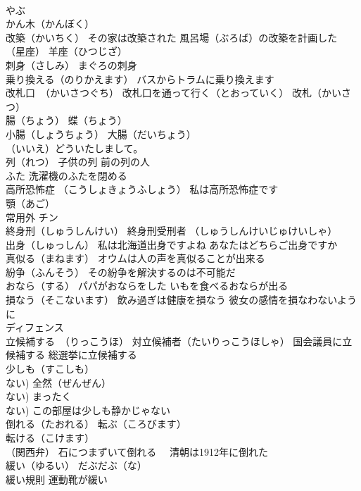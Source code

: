 \documentclass[8pt]{extreport}
\begin{document}
\begin{CJK}{UTF8}{min}
\\	やぶ 
\\	かん木（かんぼく）
\\	改築（かいちく） その家は改築された 風呂場（ぶろば）の改築を計画した
\\	（星座）	羊座（ひつじざ）
\\	刺身（さしみ） まぐろの刺身
\\	乗り換える（のりかえます） バスからトラムに乗り換えます
\\	改札口　（かいさつぐち） 改札口を通って行く（とおっていく） 改札（かいさつ） 
\\	腸（ちょう） 蝶（ちょう）
\\	小腸（しょうちょう） 大腸（だいちょう）
\\	（いいえ）どういたしまして。
\\	列（れつ） 子供の列 前の列の人
\\	ふた 洗濯機のふたを閉める
\\	高所恐怖症 （こうしょきょうふしょう） 私は高所恐怖症です
\\	顎（あご）　
\\	常用外 チン
\\	終身刑（しゅうしんけい） 終身刑受刑者 （しゅうしんけいじゅけいしゃ）
\\	出身（しゅっしん） 私は北海道出身ですよね あなたはどちらご出身ですか
\\	真似る（まねます） オウムは人の声を真似ることが出来る
\\	紛争（ふんそう） その紛争を解決するのは不可能だ
\\	おなら（する） パパがおならをした いもを食べるおならが出る
\\	損なう（そこないます） 飲み過ぎは健康を損なう 彼女の感情を損なわないように
\\	ディフェンス
\\	立候補する　（りっこうほ） 対立候補者（たいりっこうほしゃ） 国会議員に立候補する 総選挙に立候補する
\\	少しも（すこしも）
\\	ない) 全然（ぜんぜん）
\\	ない) まったく
\\	ない) この部屋は少しも静かじゃない
\\	倒れる（たおれる） 転ぶ（ころびます）
\\	転ける（こけます）
\\	（関西弁） 石につまずいて倒れる　 清朝は1912年に倒れた
\\	緩い（ゆるい） だぶだぶ（な） 
\\	緩い規則 運動靴が緩い

\end{CJK}
\end{document}
